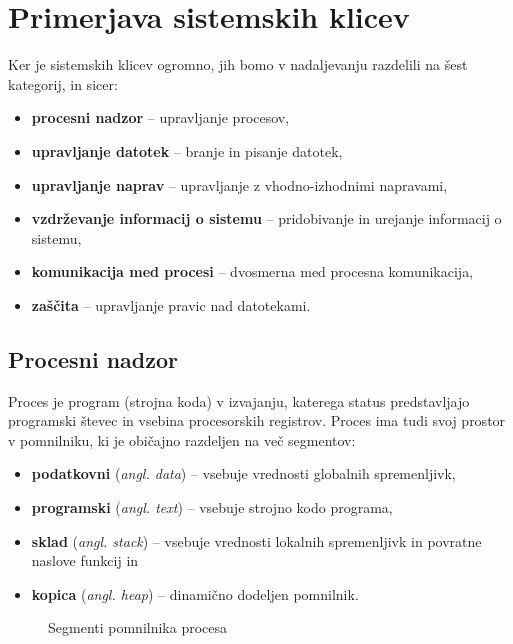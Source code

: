 \documentclass[a4paper,12pt,openright]{book}
\begin{document}
\chapter{Primerjava sistemskih klicev}

Ker je sistemskih klicev ogromno, jih bomo v nadaljevanju razdelili na šest kategorij, in sicer:
\begin{itemize}
	\item \textbf{procesni nadzor} -- upravljanje procesov,
	\item \textbf{upravljanje datotek} -- branje in pisanje datotek,
	\item \textbf{upravljanje naprav} -- upravljanje z vhodno-izhodnimi napravami,
	\item \textbf{vzdrževanje informacij o sistemu} -- pridobivanje in urejanje informacij o sistemu,
	\item \textbf{komunikacija med procesi} -- dvosmerna med procesna komunikacija,
	\item \textbf{zaščita} -- upravljanje pravic nad datotekami. \cite{Silberschatz_Galvin_Gagne_2018}
\end{itemize}

\section{Procesni nadzor} \label{sec:process_control}

Proces je program (strojna koda) v izvajanju, katerega status predstavljajo programski števec in vsebina procesorskih registrov.
Proces ima tudi svoj prostor v pomnilniku, ki je običajno razdeljen na več segmentov:
\begin{itemize}
	\item \textbf{podatkovni} (\textit{angl. data}) -- vsebuje vrednosti globalnih spremenljivk,
	\item \textbf{programski} (\textit{angl. text}) -- vsebuje strojno kodo programa,
	\item \textbf{sklad} (\textit{angl. stack}) -- vsebuje vrednosti lokalnih spremenljivk in povratne naslove funkcij in
	\item \textbf{kopica} (\textit{angl. heap}) -- dinamično dodeljen pomnilnik. \cite{Silberschatz_Galvin_Gagne_2018}
\end{itemize}

\begin{figure}[h!]
	\begin{center}
	\end{center}
	\caption{Segmenti pomnilnika procesa}
\end{figure}
\end{document}
